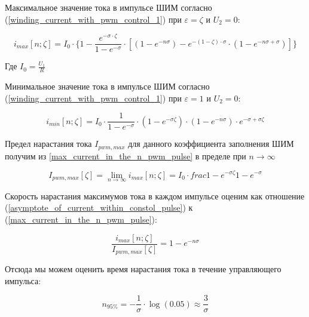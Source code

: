 Максимальное значение тока в импульсе ШИМ согласно (\ref{winding_current_with_pwm_control_1}) при
$\varepsilon=\zeta$ и $U_{2}=0$:

\begin{equation}
    \label{max_current_in_the_n_pwm_pulse}
    i_{max}[n; \zeta] =
        I_{0}
            \cdot \{ 1
                     - \frac{ e^{-\sigma \cdot \zeta} }{ 1 - e^{-\sigma} }
                       \cdot [ (1 - e^{-n\sigma})
                               - e^{ -(1 - \zeta) \cdot \sigma }
                                    \cdot ( 1 - e^{-n\sigma + \sigma} )
                             ]
                  \}
\end{equation}

Где $I_0 = \frac{ U_{1} }{ R }$

Минимальное значение тока в импульсе ШИМ согласно (\ref{winding_current_with_pwm_control_1}) при
$\varepsilon=1$ и $U_{2}=0$:

\begin{equation}
    \label{min_current_in_the_n_pwm_pulse}
    i_{min}[n; \zeta] =
        I_{0}
            \cdot \frac{ 1 }{ 1-e^{-\sigma} }
            \cdot (1 - e^{-\sigma\zeta})
            \cdot (1 - e^{-n\sigma})
            \cdot e^{-\sigma + \sigma\zeta}
\end{equation}

Предел нарастания тока $I_{pwm,max}$ для данного коэффициента заполнения ШИМ получим из
\ref{max_current_in_the_n_pwm_pulse} в пределе при $n \to \infty$

\begin{equation}
    \label{asymptote_of_current_within_constol_pulse}
    I_{pwm,max}[\zeta]=
        \lim_{n \to \infty} i_{max} [n; \zeta] =
            I_{0} \cdot frac{ 1 - e^{-\sigma\zeta} }{ 1 - e^{-\sigma}}
\end{equation}

Скорость нарастания максимумов тока в каждом импульсе оценим как отношение
(\ref{asymptote_of_current_within_constol_pulse}) к (\ref{max_current_in_the_n_pwm_pulse}):

\begin{equation}
    \label{ current_grow_estimate }
    \frac{ i_{max}[n; \zeta] }{ I_{pwm,max}[\zeta] } = 1 - e^{-n \sigma}
\end{equation}

Отсюда мы можем оценить время нарастания тока в течение управляющего импульса:

$$
    n_{ 95 \% } = - \frac{ 1 }{ \sigma }  \cdot \log{(0.05)} \approx \frac{ 3 }{ \sigma }
$$
\newpage
